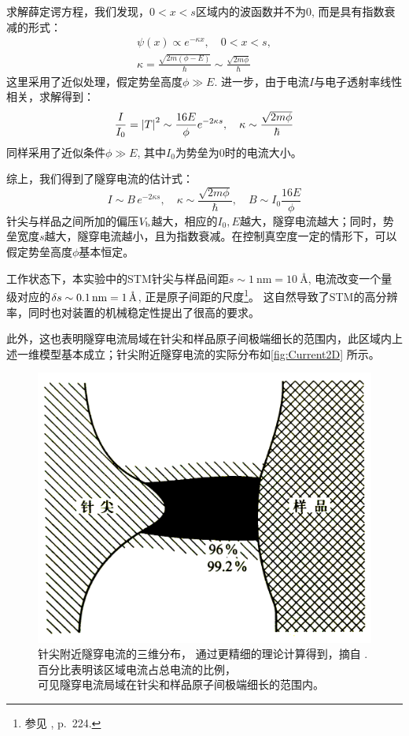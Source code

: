 \documentclass[aps,pre,12pt,preprint,%
	onecolumn,showpacs,showkeys,nofootinbib]{revtex4-1}
\begin{document}
	求解薛定谔方程，我们发现，$0 < x < s$区域内的波函数并不为0, 而是具有指数衰减的形式：
	\begin{gather}
		\psi(x) \propto e^{-\kappa x},\quad 0 < x < s,\\
		\kappa = \frac{\sqrt{2m(\phi - E)}}{\hbar}
			\sim \frac{\sqrt{2m\phi}}{\hbar}
	\end{gather}
	这里采用了近似处理，假定势垒高度$\phi \gg E$. 进一步，由于电流$I$与电子透射率线性相关，求解得到：
	\begin{equation}
		\frac{I}{I_0} = \abs{T}^2
		\sim \frac{16E}{\phi} e^{-2\kappa s},\quad
		\kappa \sim \frac{\sqrt{2m\phi}}{\hbar}
	\end{equation}
	同样采用了近似条件$\phi \gg E$, 其中$I_0$为势垒为0时的电流大小。
	
	综上，我们得到了隧穿电流的估计式：
	\begin{equation}
		I \sim B\,e^{-2\kappa s},\quad
		\kappa \sim \frac{\sqrt{2m\phi}}{\hbar},\quad
		B \sim I_0 \frac{16E}{\phi}
		\label{eq:tunnelEq}
	\end{equation}
	针尖与样品之间所加的偏压$V_\textup{b}$越大，相应的$I_0, E$越大，隧穿电流越大；同时，势垒宽度$s$越大，隧穿电流越小，且为指数衰减。在控制真空度一定的情形下，可以假定势垒高度$\phi$基本恒定。
	
	工作状态下，本实验中的STM针尖与样品间距$s \sim \SI{1}{\nm} = \SI{10}{\angstrom}$, 电流改变一个量级对应的$\var{s} \sim \SI{0.1}{\nm} = \SI{1}{\angstrom}$, 正是原子间距的尺度\footnote{%
		参见 \cite{textbook}, p.~224. }。
	这自然导致了STM的高分辨率，同时也对装置的机械稳定性提出了很高的要求。
	
	此外，这也表明隧穿电流局域在针尖和样品原子间极端细长的范围内，此区域内上述一维模型基本成立；针尖附近隧穿电流的实际分布如\autoref{fig:Current2D} 所示。
	
	\begin{figure}[!h]
	\centering
	\vspace{-0.5\baselineskip}
	\includegraphics[width=.55\linewidth]{STMcurrentDist.jpg}
	\caption[隧穿电流的三维分布]{针尖附近隧穿电流的三维分布，
		通过更精细的理论计算得到，摘自 \cite{stmIBM}. \\
		百分比表明该区域电流占总电流的比例，\\
		可见隧穿电流局域在针尖和样品原子间极端细长的范围内。
		\vspace{.5ex}
	}
	\label{fig:Current2D}
	\end{figure}
\end{document}
